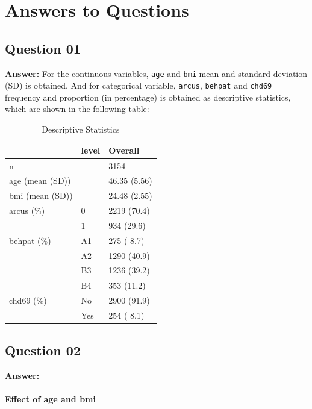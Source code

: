 \documentclass[
  12pt,
  oneside]{article}
\begin{document}
\hypertarget{answers-to-questions}{%
\section{Answers to Questions}\label{answers-to-questions}}

\hypertarget{question-01}{%
\subsection{Question 01}\label{question-01}}

\textbf{Answer:} For the continuous variables, \texttt{age} and \texttt{bmi} mean and standard deviation (SD) is obtained. And for categorical variable, \texttt{arcus}, \texttt{behpat} and \texttt{chd69} frequency and proportion (in percentage) is obtained as descriptive statistics, which are shown in the following table:

\begin{table}[H]

\caption{\label{tab:Table-01}Descriptive Statistics}
\centering
\begin{tabular}[t]{lll}
\toprule
  & level & Overall\\
\midrule
n &  & 3154\\
age (mean (SD)) &  & 46.35 (5.56)\\
bmi (mean (SD)) &  & 24.48 (2.55)\\
arcus (\%) & 0 & 2219 (70.4)\\
 & 1 & 934 (29.6)\\
\addlinespace
behpat (\%) & A1 & 275 ( 8.7)\\
 & A2 & 1290 (40.9)\\
 & B3 & 1236 (39.2)\\
 & B4 & 353 (11.2)\\
chd69 (\%) & No & 2900 (91.9)\\
\addlinespace
 & Yes & 254 ( 8.1)\\
\bottomrule
\end{tabular}
\end{table}

\clearpage

\hypertarget{question-02}{%
\subsection{Question 02}\label{question-02}}

\textbf{Answer:}

\hypertarget{effect-of-age-and-bmi}{%
\paragraph{Effect of age and bmi}\label{effect-of-age-and-bmi}}
\end{document}
